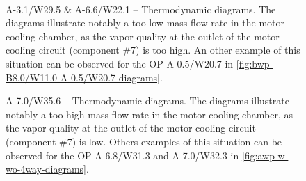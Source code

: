 \begin{figure}[htbp]
  \centering
  \hspace{1em}
  \\
  \hspace{1em}
  \caption[A-3.1/W29.5 \& A-6.6/W22.1 -- Thermodynamic
  diagrams]{A-3.1/W29.5 \& A-6.6/W22.1 -- Thermodynamic diagrams. The
    diagrams illustrate notably a too low mass flow rate in the motor
    cooling chamber, as the vapor quality at the outlet of the motor
    cooling circuit (component \#7) is too high. An other example of
    this situation can be observed for the OP A-0.5/W20.7 in
    \cref{fig:bwp-B8.0/W11.0-A-0.5/W20.7-diagrams}.}
  \label{fig:awp-too-high-motor-cooling-flow}
\end{figure}

\begin{figure}[htbp]
  \centering
  \hspace{1em}
  \caption[A-7.0/W35.6 -- Thermodynamic diagrams]{A-7.0/W35.6 --
    Thermodynamic diagrams. The diagrams illustrate notably a too high
    mass flow rate in the motor cooling chamber, as the vapor quality
    at the outlet of the motor cooling circuit (component \#7) is
    low. Others examples of this situation can be observed for the OP
    A-6.8/W31.3 and A-7.0/W32.3 in \cref{fig:awp-w-wo-4way-diagrams}.}
  \label{fig:awp-too-low-motor-cooling-flow}
\end{figure}

